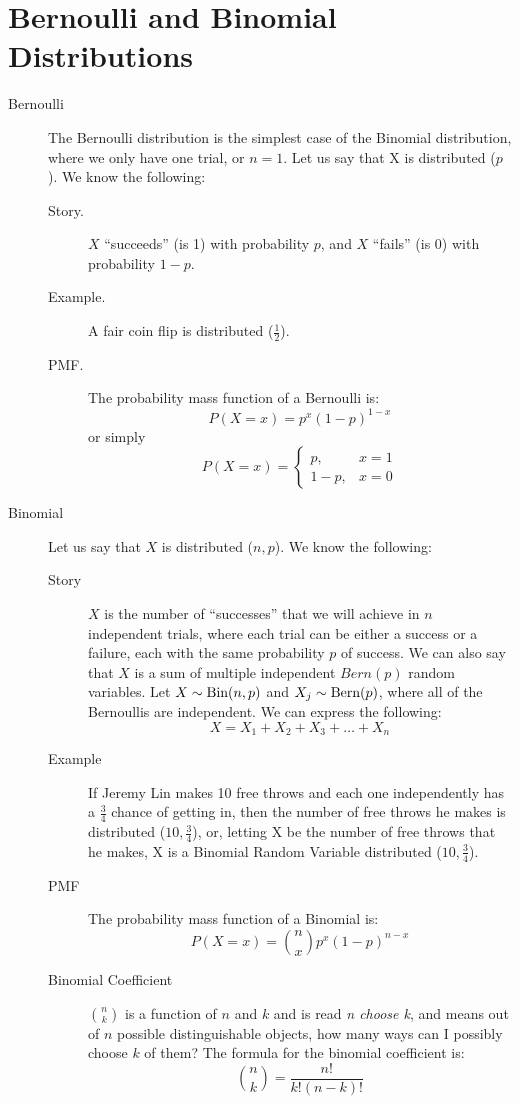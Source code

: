 \documentclass[11pt]{article}
\begin{document}
\section*{Bernoulli and Binomial Distributions}

\begin{description}
\item[Bernoulli] The Bernoulli distribution is the simplest case of the Binomial distribution, where we only have one trial, or $n=1$. Let us say that X is distributed \Bern($p$). We know the following:
\begin{description}
  \item[Story.] $X$ ``succeeds'' (is 1) with probability $p$, and $X$ ``fails'' (is 0) with probability $1-p$.
  \item[Example.] A fair coin flip is distributed \Bern($\frac{1}{2}$).
  \item[PMF.] The probability mass function of a Bernoulli is:
\[P(X = x) = p^x(1-p)^{1-x}\]
or simply
\[P(X = x) = \begin{cases} p, & x = 1 \\ 1-p, & x = 0 \end{cases}\]
\end{description}

\item[Binomial] Let us say that $X$ is distributed \Bin($n,p$). We know the following:
\begin{description}
  \item[Story] $X$ is the number of ``successes'' that we will achieve in $n$ independent trials, where each trial can be either a success or a failure, each with the same probability $p$ of success. We can also say that $X$ is a sum of multiple independent $Bern(p)$ random variables. Let $X \sim \textrm{Bin}(n, p)$ and $X_j \sim \textrm{Bern}(p)$, where all of the Bernoullis are independent. We can express the following:
  \[X = X_1 + X_2 + X_3 + \dots + X_n\]
  \item[Example] If Jeremy Lin makes 10 free throws and each one independently has a $\frac{3}{4}$ chance of getting in, then the number of free throws he makes is distributed  \Bin($10,\frac{3}{4}$), or, letting X be the number of free throws that he makes, X is a Binomial Random Variable distributed  \Bin($10,\frac{3}{4}$).
  \item[PMF] The probability mass function of a Binomial is:
\[P(X = x) = {n  \choose x} p^x(1-p)^{n-x}\]
  \item[Binomial Coefficient] ${n  \choose k}$ is a function of $n$ and $k$ and is read \emph{n choose k}, and means out of $n$ possible distinguishable objects, how many ways can I possibly choose $k$ of them? The formula for the binomial coefficient is:
\[{n  \choose k} = \frac{n!}{k!(n-k)!}\]
\end{description}
\end{description}
\end{document}
